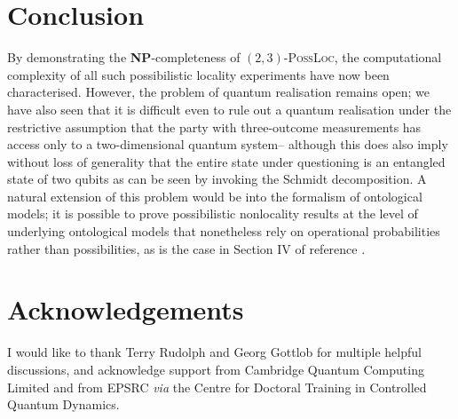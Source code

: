 \documentclass[reprint]{revtex4-1}
\theoremstyle{definition}
\begin{document}
 \section{Conclusion}
 
 By demonstrating the \textbf{NP}-completeness of $(2,3)$-\textsc{PossLoc}, the computational complexity of all such possibilistic locality experiments have now been characterised. However, the problem of quantum realisation remains open; we have also seen that it is difficult even to rule out a quantum realisation under the restrictive assumption that the party with three-outcome measurements has access only to a two-dimensional quantum system-- although this does also imply without loss of generality that the entire state under questioning is an entangled state of two qubits as can be seen by invoking the Schmidt decomposition. A natural extension of this problem would be into the formalism of ontological models; it is possible to prove possibilistic nonlocality results at the level of underlying ontological models that nonetheless rely on operational probabilities rather than possibilities, as is the case in Section IV of reference  \cite{Jevt2015}.

\section*{Acknowledgements}

I would like to thank Terry Rudolph and Georg Gottlob for multiple helpful discussions, and acknowledge support from Cambridge Quantum Computing Limited and from EPSRC \emph{via} the Centre for Doctoral Training in Controlled Quantum Dynamics.

{}

\end{document}
